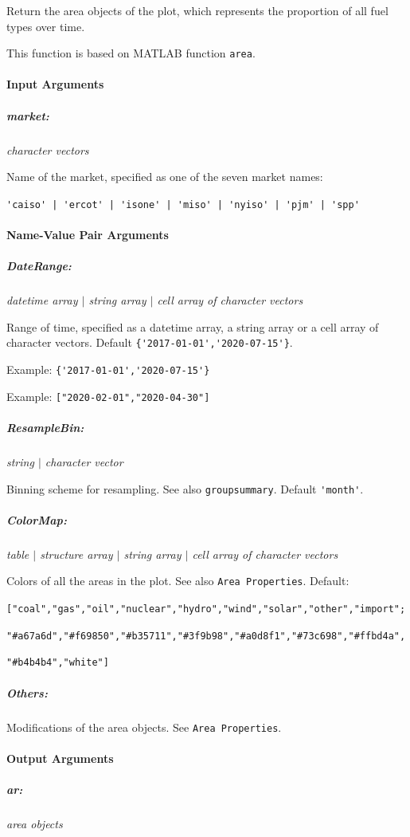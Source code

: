 \documentclass[11pt]{article}
\newcommand{\matlab}{\textsc{MATLAB}}
\numberwithin{equation}{section}
\numberwithin{table}{section}
\numberwithin{figure}{section}
\begin{document}
Return the area objects of the plot, which represents the proportion of all fuel types over time.

This function is based on \matlab{} function \verb!area!.


\paragraph{Input Arguments}
\subparagraph{market:} \textit{character vectors}

Name of the market, specified as one of the seven market names:

\verb!'caiso' | 'ercot' | 'isone' | 'miso' | 'nyiso' | 'pjm' | 'spp'!

\paragraph{Name-Value Pair Arguments}
\subparagraph{DateRange:} \textit{datetime array $|$ string array $|$ cell array of character vectors}

Range of time, specified as a datetime array, a string array or a cell array of character vectors. Default \verb!{'2017-01-01','2020-07-15'}!.

Example: \verb!{'2017-01-01','2020-07-15'}!

Example: \verb!["2020-02-01","2020-04-30"]!

\subparagraph{ResampleBin:} \textit{string $|$ character vector}

Binning scheme for resampling. See also \verb!groupsummary!. Default \verb!'month'!.

\subparagraph{ColorMap:} \textit{table $|$ structure array $|$ string array $|$ cell array of character vectors}

Colors of all the areas in the plot. See also \verb!Area Properties!. Default:

\verb!["coal","gas","oil","nuclear","hydro","wind","solar","other","import";!

\verb!"#a67a6d","#f69850","#b35711","#3f9b98","#a0d8f1","#73c698","#ffbd4a",!

\verb!"#b4b4b4","white"]!

\subparagraph{Others:}

Modifications of the area objects. See \verb!Area Properties!.



\paragraph{Output Arguments}
\subparagraph{ar:} \textit{area objects}
\end{document}
